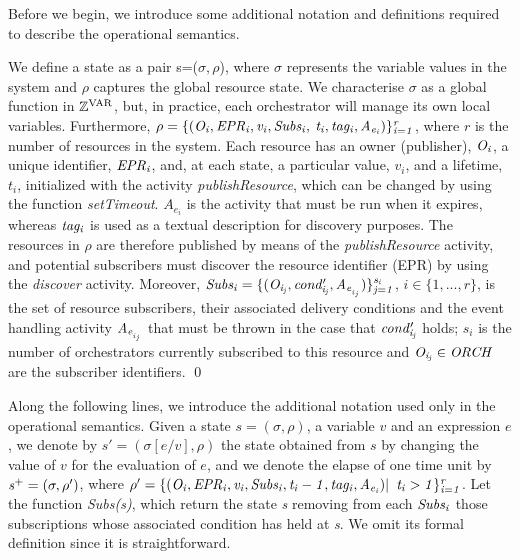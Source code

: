 Before we begin, we introduce some additional notation and definitions required to describe the operational semantics.
\begin{definition}[State] %
We define a state as a pair s=($\sigma, \rho$), where $\sigma$ represents the variable values in the system and $\rho$ captures the global resource state. We characterise $\sigma$ as a global function in ${\it \mathbb{Z}^\textrm{VAR}}$, but, in practice, each orchestrator will manage its own local variables. Furthermore, $\it{ \rho=\{(O_i,EPR_i,v_i,Subs_i,}$ $\it{ t_i,tag_i,A_{e{_i}})\}_{i=1}^r}$, where $r$ is the number of resources in the system. Each resource has an owner (publisher), ${\it O_i}$, a unique identifier, ${\it EPR_i}$, and, at each state, a particular value, $v_i$, and a lifetime, $t_i$, initialized with the activity {\it publishResource}, which can be changed by using the function {\it setTimeout}. $A_{e{_i}}$ is the activity that must be run when it expires, whereas ${\it tag_i}$ is used as a textual description for discovery purposes. The resources in $\rho$ are therefore published by means of the {\em publishResource} activity, and potential subscribers must discover the resource identifier (EPR) by using the {\it discover} activity. %
Moreover, $\it{Subs_i=\{(O_{i_{j}},cond'_{i_{j}},A_{e{_{_i{_{_j}}}}})\}_{j=1}^{{s_i}}}$, $i \in \{1,...,r\}$, is the set of resource subscribers, their associated delivery conditions and the event handling activity ${\it A_{e{_{_i{_{_j}}}}}}$ that must be thrown in the case that ${\it cond'_{i_{j}}}$ holds; $s_i$ is the number of orchestrators currently subscribed to this resource and ${\it O_{i_{j}} \in ORCH}$ are the subscriber identifiers.
\qed
\end{definition}

Along the following lines, we introduce the additional notation used only in the operational semantics. Given a state $s=(\sigma,\rho)$, a variable $v$ and an expression $e$, we denote by $s'=(\sigma[e/v],\rho)$ the state obtained from $s$
by changing the value of $v$ for the evaluation of $e$, and we denote the elapse of one time unit by ${\it s{^+}=(\sigma,\rho')}$, where ${\it \rho'=\{(O_i,EPR_i,v_i,Subs_i,t_i-1,tag_i,A_{e{_i}})|}$ ${\it t_i>1\}_{i=1}^r}$. Let the function {\it Subs(s)}, which return the state {\it s} removing from each ${\it Subs_i}$ those subscriptions whose associated condition has held at {\it s}. %
We omit its formal definition since it is straightforward.

